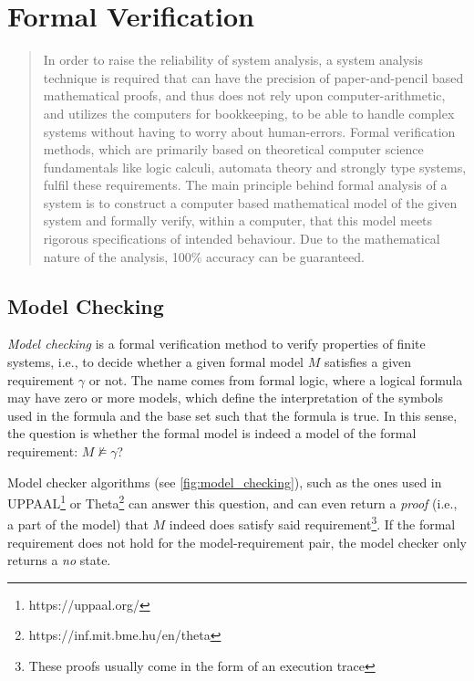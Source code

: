 \section{Formal Verification}\label{sec:formal_verification}

\blockcquote{https://doi:10.4018/978-1-4666-5888-2.ch705}{
	In order to raise the reliability of system analysis, a system analysis technique is required that can have the precision of paper-and-pencil based mathematical proofs, and thus does not rely upon computer-arithmetic, and utilizes the computers for bookkeeping, to be able to handle complex systems without having to worry about human-errors. Formal verification methods, which are primarily based on theoretical computer science fundamentals like logic calculi, automata theory and strongly type systems, fulfil these requirements. The main principle behind formal analysis of a system is to construct a computer based mathematical model of the given system and formally verify, within a computer, that this model meets rigorous specifications of intended behaviour. Due to the mathematical nature of the analysis, 100\% accuracy can be guaranteed.
}

\subsection{Model Checking}

\emph{Model checking} is a formal verification method to verify properties of finite systems, i.e., to decide whether a given formal model \(M\) satisfies a given requirement \(\gamma\) or not. The name comes from formal logic, where a logical formula may have zero or more models, which define the interpretation of the symbols used in the formula and the base set such that the formula is true. In this sense, the question is whether the formal model is indeed a model of the formal requirement: \(M \not\models \gamma\)?

Model checker algorithms (see \autoref{fig:model_checking}), such as the ones used in UPPAAL\footnote{https://uppaal.org/} \cite{uppaal} or Theta\footnote{https://inf.mit.bme.hu/en/theta} \cite{theta} can answer this question, and can even return a \emph{proof} (i.e., a part of the model) that \(M\) indeed does satisfy said requirement\footnote{These proofs usually come in the form of an execution trace}. If the formal requirement does not hold for the model-requirement pair, the model checker only returns a \emph{no} state.

